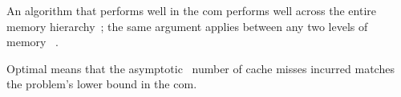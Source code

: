 %
%
%
An algorithm that performs well in the \gls{com} performs well across the entire memory
hierarchy~\cites[194\psq]{afmh}[4]{erikcom}; the same argument  applies between any two levels of memory%
~\cite[lemma 15, \pno~10]{coa-paper}.

%
%
%
%
Optimal means that the asymptotic~\cite[2]{coa-paper} number of cache misses incurred
 matches the problem's lower bound in the \gls{com}.

